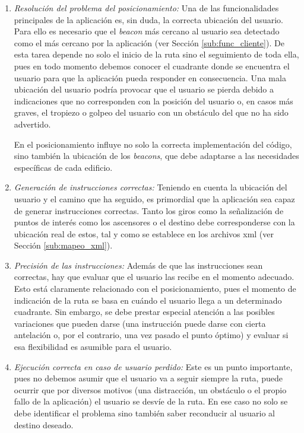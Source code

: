 \begin{enumerate}
	
	\item \textit{Resolución del problema del posicionamiento:} Una de las funcionalidades principales de la aplicación es, sin duda, la correcta ubicación del usuario. Para ello es necesario que el \textit{beacon} más cercano al usuario sea detectado como el más cercano por la aplicación (ver Sección \ref{sub:func_cliente}). De esta tarea depende no solo el inicio de la ruta sino el seguimiento de toda ella, pues en todo momento debemos conocer el cuadrante donde se encuentra el usuario para que la aplicación pueda responder en consecuencia. Una mala ubicación del usuario podría provocar que el usuario se pierda debido a indicaciones que no corresponden con la posición del usuario o, en casos más graves, el tropiezo o golpeo del usuario con un obstáculo del que no ha sido advertido.
	
	En el posicionamiento influye no solo la correcta implementación del código, sino también la ubicación de los \textit{beacons}, que debe adaptarse a las necesidades específicas de cada edificio. 
	
	\item \textit{Generación de instrucciones correctas:} Teniendo en cuenta la ubicación del usuario y el camino que ha seguido, es primordial que la aplicación sea capaz de generar instrucciones correctas. Tanto los giros como la señalización de puntos de interés como los ascensores o el destino debe corresponderse con la ubicación real de estos, tal y como se establece en los archivos xml (ver Sección \ref{sub:mapeo_xml}).
	
	\item \textit{Precisión de las instrucciones:} Además de que las instrucciones sean correctas, hay que evaluar que el usuario las recibe en el momento adecuado. Esto está claramente relacionado con el posicionamiento, pues el momento de indicación de la ruta se basa en cuándo el usuario llega a un determinado cuadrante. Sin embargo, se debe prestar especial atención a las posibles variaciones que pueden darse (una instrucción puede darse con cierta antelación o, por el contrario, una vez pasado el punto óptimo) y evaluar si esa flexibilidad es asumible para el usuario.
	
	\item \textit{Ejecución correcta en caso de usuario perdido:} Este es un punto importante, pues no debemos asumir que el usuario va a seguir siempre la ruta, puede ocurrir que por diversos motivos (una distracción, un obstáculo o el propio fallo de la aplicación) el usuario se desvíe de la ruta. En ese caso no solo se debe identificar el problema sino también saber reconducir al usuario al destino deseado. 
		
\end{enumerate}



